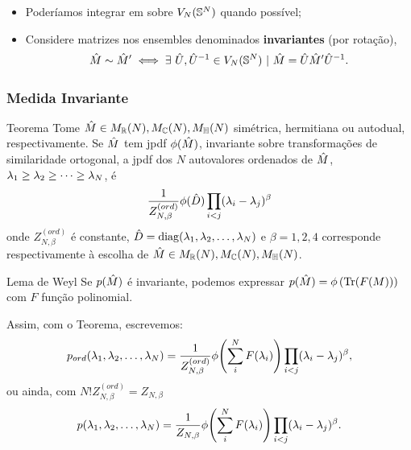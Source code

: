 \begin{frame}
{	\vspace{1cm}
	
	\begin{itemize}
		\item Poderíamos integrar em sobre $V_N(\mathbb{S}^N)$ quando possível;
		
		\item Considere matrizes nos ensembles denominados \textbf{invariantes} (por rotação), $$\hat M \sim \hat M' \iff \exists \  \hat U, \hat U^{-1} \in V_N(\mathbb{S}^N)  \ | \ \hat M = \hat U \hat M' \hat U^{-1}.$$
	\end{itemize}
}	

\end{frame}
\begin{frame}
	\frametitle{Medida Invariante}
	\begin{block}{Teorema \cite[Capítulo~3]{AlanThesis}}
		Tome $\hat M \in M_{\mathbb{R}}(N),  M_{\mathbb{C}}(N),  M_{\mathbb{H}}(N)$ simétrica, hermitiana ou autodual, respectivamente. Se  $\hat M$ tem jpdf $\phi(\hat M)$, invariante sobre transformações de similaridade ortogonal, a jpdf dos $N$ autovalores ordenados de $\hat M$, $\lambda_1 \geq \lambda_2 \geq \dots \geq \lambda_N$, é $$ \frac{1}{Z_{N, \beta}^{(ord)}} \phi(\hat D) \prod_{i < j} (\lambda_i - \lambda_j)^{\beta}$$ onde $Z_{N, \beta}^{(ord)}$ é constante, $\hat D = \operatorname{diag}(\lambda_1, \lambda_2, \dots, \lambda_N)$ e $\beta = 1, 2, 4$ corresponde respectivamente à escolha de $\hat M \in M_{\mathbb{R}}(N),  M_{\mathbb{C}}(N),  M_{\mathbb{H}}(N)$. 
	\end{block}
\end{frame}
\begin{frame}
	
 	\begin{block}{Lema de Weyl}
 		Se $p(\hat M)$ é invariante, podemos expressar $p(\hat M)= \phi \left(\Tr(F(M)) \right)$ com $F$ função polinomial.
 	\end{block}
	Assim, com o Teorema, escrevemos: 
	\[
		p_{ord}(\lambda_1, \lambda_2, \dots, \lambda_N) = \frac{1}{Z_{N, \beta}^{(ord)}} \phi{\left( \sum_i^N F(\lambda_i) \right)} \prod_{i < j} (\lambda_i - \lambda_j)^{\beta},
	\]
	ou ainda, com $N! Z_{N, \beta}^{(ord)} = Z_{N, \beta}$
	\begin{equation}
		p(\lambda_1, \lambda_2, \dots, \lambda_N) = \frac{1}{Z_{N, \beta}} \phi{\left( \sum_i^N F(\lambda_i) \right)} \prod_{i < j} (\lambda_i - \lambda_j)^{\beta}.
		\label{Equation: p}
	\end{equation}
\end{frame}

